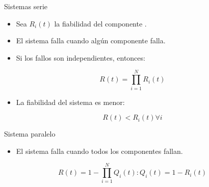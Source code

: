 \begin{frame}[t]{Sistemas serie}
\begin{itemize}
  \item Sea $R_i(t)$ la fiabilidad del componente .
  \item El sistema falla cuando algún componente falla.
\end{itemize}

\begin{center}

\end{center}

\pause
\begin{itemize}
  \item Si los fallos son independientes, entonces:
\end{itemize}
\begin{equation*}
R(t) = \prod_{i=1}^{N} R_i(t)
\end{equation*}

\begin{itemize}
  \item La fiabilidad del sistema es menor:
\end{itemize}
\begin{equation*}
R(t) < R_i(t) \forall i
\end{equation*}
\end{frame}

\begin{frame}[t]{Sistema paralelo}
\begin{itemize}
  \item El sistema falla cuando todos los componentes fallan.
\end{itemize}

\begin{equation*}
R(t) = 1 - \prod_{i=1}^N Q_i(t) : Q_i(t) = 1 - R_i(t)
\end{equation*}

\begin{center}

\end{center}
\end{frame}

